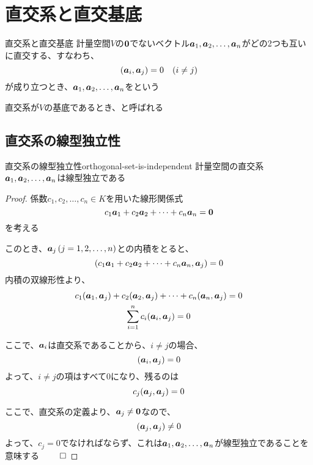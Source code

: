 \documentclass[../../../topic_linear-algebra]{subfiles}
\begin{document}
\sectionline
\section{直交系と直交基底}

\begin{definition*}{直交系と直交基底}
  計量空間$V$の$\vb*{0}$でないベクトル$\vb*{a}_1, \vb*{a}_2, \ldots, \vb*{a}_n$がどの2つも互いに直交する、すなわち、
  \begin{equation*}
    (\vb*{a}_i, \vb*{a}_j) = 0 \quad (i \neq j)
  \end{equation*}
  が成り立つとき、$\vb*{a}_1, \vb*{a}_2, \ldots, \vb*{a}_n$をという

  直交系が$V$の基底であるとき、と呼ばれる
\end{definition*}

\subsection{直交系の線型独立性}

\begin{theorem}{直交系の線型独立性}{orthogonal-set-is-independent}
  計量空間の直交系$\vb*{a}_1, \vb*{a}_2, \ldots, \vb*{a}_n$は線型独立である
\end{theorem}

\begin{proof}
  係数$c_1, c_2, \ldots, c_n \in K$を用いた線形関係式
  \begin{equation*}
    c_1 \vb*{a}_1 + c_2 \vb*{a}_2 + \cdots + c_n \vb*{a}_n = \vb*{0}
  \end{equation*}
  を考える

  このとき、$\vb*{a}_j \, (j=1,2,\ldots,n)$との内積をとると、
  \begin{equation*}
    (c_1 \vb*{a}_1 + c_2 \vb*{a}_2 + \cdots + c_n \vb*{a}_n, \vb*{a}_j) = 0
  \end{equation*}
  内積の双線形性より、
  \begin{gather*}
    c_1 (\vb*{a}_1, \vb*{a}_j) + c_2 (\vb*{a}_2, \vb*{a}_j) + \cdots + c_n (\vb*{a}_n, \vb*{a}_j) = 0 \\
    \sum_{i=1}^n c_i (\vb*{a}_i, \vb*{a}_j) = 0
  \end{gather*}

  ここで、$\vb*{a}_i$は直交系であることから、$i \neq j$の場合、
  \begin{equation*}
    (\vb*{a}_i, \vb*{a}_j) = 0
  \end{equation*}
  よって、$i \neq j$の項はすべて0になり、残るのは
  \begin{equation*}
    c_j (\vb*{a}_j, \vb*{a}_j) = 0
  \end{equation*}

  ここで、直交系の定義より、$\vb*{a}_j \neq \vb*{0}$なので、
  \begin{equation*}
    (\vb*{a}_j, \vb*{a}_j) \neq 0
  \end{equation*}
  よって、$c_j = 0$でなければならず、これは$\vb*{a}_1, \vb*{a}_2, \ldots, \vb*{a}_n$が線型独立であることを意味する $\qed$
\end{proof}
\end{document}
